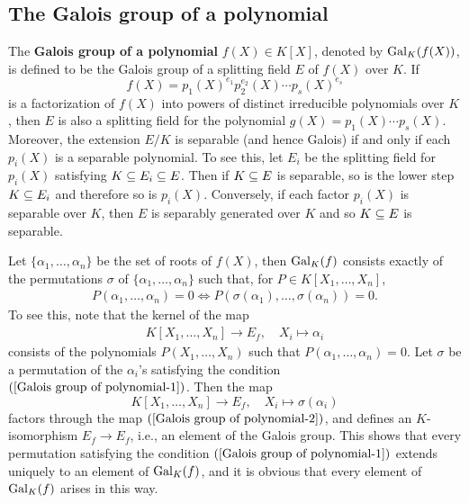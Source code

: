 \subsection{The Galois group of a polynomial}
The \textbf{Galois group of a polynomial} $f(X)\in K[X]$, denoted by $\mathrm{Gal}_K(f(X))$, is defined to be the Galois group of a splitting field $E$ of $f(X)$ over $K$. If
\[f(X)=p_1(X)^{e_1}p_2^{e_2}(X)\cdots p_s(X)^{e_s}\]
is a factorization of $f(X)$ into powers of distinct irreducible polynomials over $K$, then $E$ is also a splitting field for the polynomial $g(X)=p_1(X)\cdots p_s(X)$. Moreover, the extension $E/K$ is separable (and hence Galois) if and only if each $p_i(X)$ is a separable polynomial. To see this, let $E_i$ be the splitting field for $p_i(X)$ satisfying $K\subseteq E_i\subseteq E$. Then if $K\subseteq E$ is separable, so is the lower step $K\subseteq E_i$ and therefore so is $p_i(X)$. Conversely, if each factor $p_i(X)$ is separable over $K$, then $E$ is separably generated over $K$ and so $K\subseteq E$ is separable.\par
Let $\{\alpha_1,\dots,\alpha_n\}$ be the set of roots of $f(X)$, then $\mathrm{Gal}_K(f)$ consists exactly of the permutations $\sigma$ of $\{\alpha_1,\dots,\alpha_n\}$ such that, for $P\in K[X_1,\dots,X_n]$,
\begin{align}\label{Galois group of polynomial-1}
P(\alpha_1,\dots,\alpha_n)=0\Leftrightarrow P(\sigma(\alpha_1),\dots,\sigma(\alpha_n))=0.
\end{align}
To see this, note that the kernel of the map
\begin{align}\label{Galois group of polynomial-2}
K[X_1,\dots,X_n]\to E_f,\quad X_i\mapsto \alpha_i
\end{align}
consists of the polynomials $P(X_1,\dots,X_n)$ such that $P(\alpha_1,\dots,\alpha_n)=0$. Let $\sigma$ be a permutation of the $\alpha_i$'s satisfying the condition $(\ref{Galois group of polynomial-1})$. Then the map
\[K[X_1,\dots,X_n]\to E_f,\quad X_i\mapsto\sigma(\alpha_i)\]
factors through the map $(\ref{Galois group of polynomial-2})$, and defines an $K$-isomorphism $E_f\to E_f$, i.e., an element of the Galois group. This shows that every permutation satisfying the condition $(\ref{Galois group of polynomial-1})$ extends uniquely to an element of $\mathrm{Gal}_K(f)$, and it is obvious that every element of $\mathrm{Gal}_K(f)$ arises in this way.
